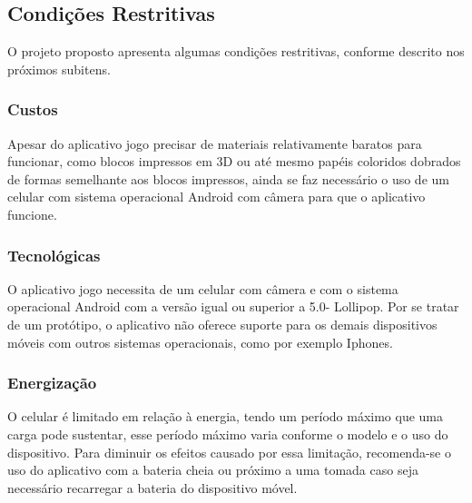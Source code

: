     \subsection{Condições Restritivas}
    O projeto proposto apresenta algumas condições restritivas, conforme descrito
    nos próximos subitens.

        \subsubsection{Custos}
        Apesar do aplicativo jogo precisar de materiais relativamente baratos para funcionar, como blocos impressos em 3D ou até mesmo papéis coloridos dobrados de formas semelhante aos blocos impressos, ainda se faz necessário o uso de um celular com sistema operacional Android com câmera para que o aplicativo funcione. 
            
        
        \subsubsection{Tecnológicas}
        O aplicativo jogo necessita de um celular com câmera e com o sistema operacional Android com a versão igual ou superior a 5.0- Lollipop. Por se tratar de um protótipo, o aplicativo não oferece suporte para os demais dispositivos móveis com outros sistemas operacionais, como por exemplo Iphones. 
        
        \subsubsection{Energização}
        O celular é limitado em relação à energia, tendo um período máximo que uma carga pode sustentar, esse período máximo varia conforme o modelo e o uso do dispositivo. Para diminuir os efeitos causado por essa limitação, recomenda-se o uso do aplicativo com a bateria cheia ou próximo a uma tomada caso seja necessário recarregar a bateria do dispositivo móvel.   
        
    
